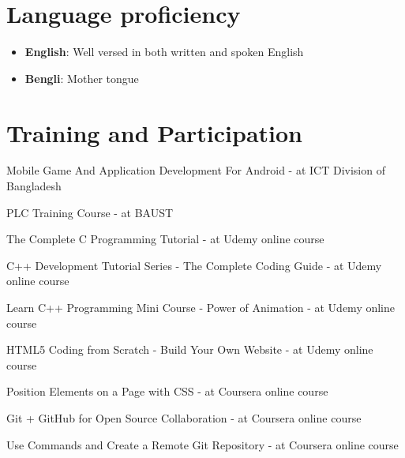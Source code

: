 \documentclass[a4paper,20pt]{article}
\newcommand{\resumeItem}[2]{
  \item\small{
    \textbf{#1}{: #2 \vspace{-2pt}}
  }
}
\newcommand{\resumeSubItem}[2]{\resumeItem{#1}{#2}\vspace{-3pt}}
\newcommand{\resumeSubHeadingListStart}{\begin{itemize}[leftmargin=*]}
\newcommand{\resumeSubHeadingListEnd}{\end{itemize}}
\begin{document}
\section{Language proficiency}
	\resumeSubHeadingListStart
	\resumeSubItem{English\hspace{2mm}}{Well versed in both written and spoken English}
	\resumeSubItem{Bengli\hspace{3.6mm}}{Mother tongue}

\resumeSubHeadingListEnd
\vspace{5pt}

\section{Training and Participation}
\begin{description}[font=$\bullet$]
\item {Mobile Game And Application Development For Android - at ICT Division of Bangladesh}
\vspace{-5pt}
\item {PLC Training Course - at BAUST}
\vspace{-5pt}
\item {The Complete C Programming Tutorial - at Udemy online course}
\vspace{-5pt}
\item {C++ Development Tutorial Series - The Complete Coding Guide - at Udemy online course }
\vspace{-5pt}
\item {Learn C++ Programming Mini Course - Power of Animation - at Udemy online course}
\vspace{-5pt}
\item {HTML5 Coding from Scratch - Build Your Own Website - at Udemy online course}
\vspace{-5pt}
\item {Position Elements on a Page with CSS - at Coursera online course }
\vspace{-5pt}
\item {Git + GitHub for Open Source Collaboration - at Coursera online course}
\vspace{-5pt}
\item {Use Commands and Create a Remote Git Repository - at Coursera online course}

\end{description}
\end{document}
